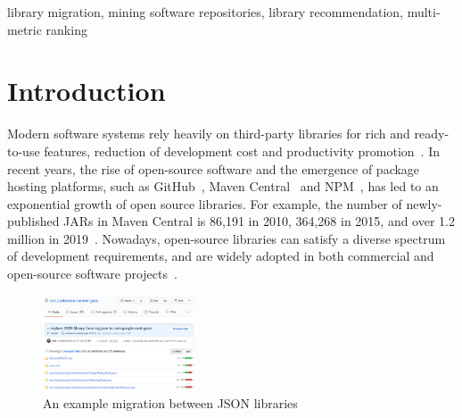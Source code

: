 \documentclass[conference, 10pt]{IEEEtran}
\begin{document}
\begin{IEEEkeywords}
library migration, mining software repositories, library recommendation, multi-metric ranking
\end{IEEEkeywords}

\section{Introduction}

Modern software systems rely heavily on third-party libraries for rich and ready-to-use features, reduction of development cost and productivity promotion~\cite{1994IEEESoftware-Lim-Effects, 2007ESEM-Mohagheghi-Quality}. 
In recent years, the rise of open-source software and the emergence of package hosting platforms, such as GitHub~\cite{GitHub}, Maven Central~\cite{Maven} and NPM~\cite{NPM}, has led to an exponential growth of open source libraries.
For example, the number of newly-published JARs in Maven Central is 86,191 in 2010, 364,268 in 2015, and over 1.2 million in 2019~\cite{Maven}. 
Nowadays, open-source libraries can satisfy a diverse spectrum of development requirements, and are widely adopted in both commercial and open-source software projects~\cite{2020ICSME-Wang-Empirical}.

\begin{figure}
  \centering
  \includegraphics[width=0.4\textwidth]{fig/example.png}
  \caption{An example migration between JSON libraries}
  \label{fig:example}
\vspace{-2mm}
\end{figure}
\end{document}
